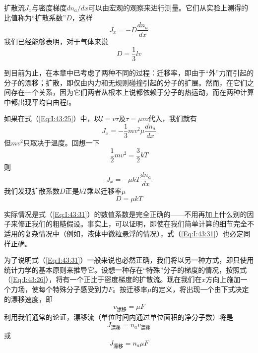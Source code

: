 扩散流$J_x$与密度梯度$dn_a /dx$可以由宏观的观察来进行测量。它们从实验上测得的比值称为“扩散系数”$D$，这样
\begin{equation}
    \label{Eq:I:43:26}
    J_x = -D\frac{dn_a}{dx}
\end{equation}
我们已经能够表明，对于气体来说
\begin{equation}
    \label{Eq:I:43:27}
    D=\frac{1}{3}lv
\end{equation}

到目前为止，在本章中已考虑了两种不同的过程：迁移率，即由于“外”力而引起的分子的漂移；扩散，即仅由内力和无规则碰撞引起的分子的扩展。然而，在它们之间存在一个关系，因为它们两者从根本上说都依赖于分子的热运动，而在两种计算中都出现平均自由程$l$。

如果在式（\ref{Eq:I:43:25}）中，以$l =v\tau$及$\tau=\mu m$代入，我们就有
\begin{equation}
    \label{Eq:I:43:28}
    J_x = -\frac{1}{3}mv^2\mu\frac{dn_a}{dx}
\end{equation}
但$mv^2$只取决于温度。回想一下
\begin{equation}
    \label{Eq:I:43:29}
    \frac{1}{2}mv^2=\frac{3}{2}kT
\end{equation}
则
\begin{equation}
    \label{Eq:I:43:30}
    J_x = -\mu kT\frac{dn_a}{dx}
\end{equation}
我们发现扩散系数$D$正是$kT$乘以迁移率$\mu$
\begin{equation}
    \label{Eq:I:43:31}
    D=\mu kT
\end{equation}

实际情况是式（\ref{Eq:I:43:31}）的数值系数是完全正确的——不用再加上什么别的因子来修正我们的粗糙假设。事实上，可以证明，即使在我们简单计算的细节完全不适用的复杂情况中（例如，液体中微粒悬浮的情况），式（\ref{Eq:I:43:31}）也必定同样正确。

为了说明式（\ref{Eq:I:43:31}）一般来说也必然正确，我们将以另一种方式，即只使用统计力学的基本原则来推导它。设想一种存在“特殊”分子的梯度的情况，按照式（\ref{Eq:I:43:26}），将有一个正比于密度梯度的扩散流。现在我们在$x$方向上施加一个力场，使每个特殊分子感受到力$F$。按迁移率$\mu$的定义，将出现一个由下式决定的漂移速度，即
\begin{equation}
    \label{Eq:I:43:32}
    v_\text{漂移}=\mu F
\end{equation}
利用我们通常的论证，漂移流（单位时间内通过单位面积的净分子数）将是
\begin{equation}
    \label{Eq:I:43:33}
    J_\text{漂移} = n_av_\text{漂移}
\end{equation}
或
\begin{equation}
    \label{Eq:I:43:34}
    J_\text{漂移} = n_a\mu F
\end{equation}

